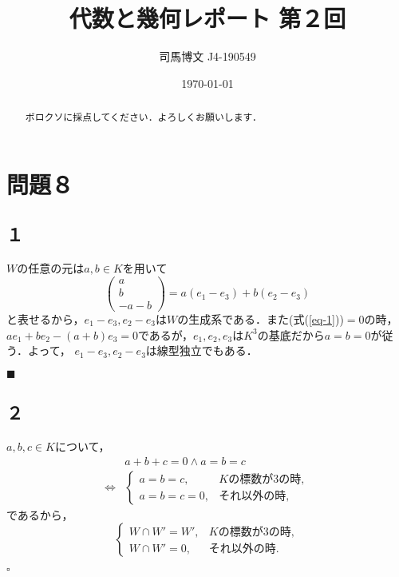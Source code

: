 \documentclass[uplatex, dvipdfmx]{jsarticle}
\title{代数と幾何レポート 第２回}
\author{司馬博文 J4-190549}
\date{\today}
\begin{document}
\maketitle
\begin{abstract}
    ボロクソに採点してください．よろしくお願いします．
\end{abstract}

\section*{問題８}
\subsection*{１}

$W$の任意の元は$a,b\in K$を用いて
\begin{equation}\label{eq-1}
    \begin{pmatrix}a\\b\\-a-b\end{pmatrix}=a(e_1-e_3)+b(e_2-e_3)
\end{equation}
と表せるから，$e_1-e_3,e_2-e_3$は$W$の生成系である．また(式(\ref{eq-1}))$=0$の時，
$ae_1+be_2-(a+b)e_3=0$であるが，$e_1,e_2,e_3$は$K^3$の基底だから$a=b=0$が従う．よって，
$e_1-e_3,e_2-e_3$は線型独立でもある．
\begin{flushright}$\blacksquare$\end{flushright}

\subsection*{２}

$a,b,c\in K$について，
\begin{align*}
    &a+b+c=0\land a=b=c\\
    \Leftrightarrow& \begin{cases}
        a=b=c,&Kの標数が3の時,\\
        a=b=c=0,&それ以外の時,
    \end{cases}
\end{align*}
であるから，
\[\begin{cases}
    W\cap W'=W',&Kの標数が3の時,\\
    W\cap W'=0,&それ以外の時.
\end{cases}\]
\begin{flushright}$\square$\end{flushright}
\end{document}
